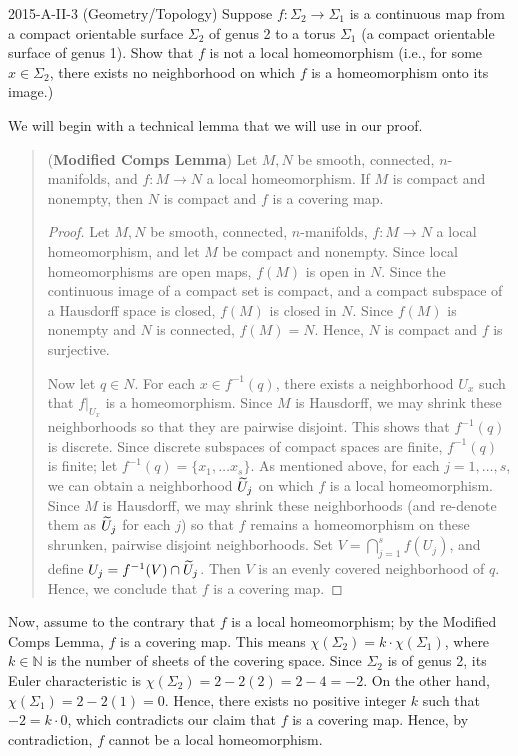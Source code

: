 \documentclass{article}
\begin{document}
\begin{prb}{2015-A-II-3 (Geometry/Topology)}
	Suppose $f: \Sigma_{2} \to \Sigma_{1}$ is a continuous map from a compact orientable surface $\Sigma_{2}$ of genus 2 to a torus $\Sigma_{1}$ (a compact orientable surface of genus 1). Show that $f$ is not a local homeomorphism (i.e., for some $x \in \Sigma_{2}$, there exists no neighborhood on which $f$ is a homeomorphism onto its image.)
\end{prb}
\begin{solutions}
	We will begin with a technical lemma that we will use in our proof. 
		\begin{quote}
			(\textbf{Modified Comps Lemma}) Let $M, N$ be smooth, connected, $n$-manifolds, and $f: M\to N$ a local homeomorphism. If $M$ is compact and nonempty, then $N$ is compact and $f$ is a covering map. 
			
			\begin{proof}
				Let $M, N$ be smooth, connected, $n$-manifolds, $f: M \to N$ a local homeomorphism, and let $M$ be compact and nonempty. Since local homeomorphisms are open maps, $f(M)$ is open in $N$. Since the continuous image of a compact set is compact, and a compact subspace of a Hausdorff space is closed, $f(M)$ is closed in $N$. Since $f(M)$ is nonempty and $N$ is connected, $f(M) = N$. Hence, $N$ is compact and $f$ is surjective. 
				
				Now let $q \in N$. For each $x \in f^{-1}(q)$, there exists a neighborhood $U_{x}$ such that $f|_{U_{x}}$ is a homeomorphism. Since $M$ is Hausdorff, we may shrink these neighborhoods so that they are pairwise disjoint. This shows that $f^{-1}(q)$ is discrete. Since discrete subspaces of compact spaces are finite, $f^{-1}(q)$ is finite; let $f^{-1}(q) = \{x_{1}, \ldots x_{s}\}$. As mentioned above, for each $j = 1, \ldots, s$, we can obtain a neighborhood $\widetilde{U}_{j}$ on which $f$ is a local homeomorphism. Since $M$ is Hausdorff, we may shrink these neighborhoods (and re-denote them as $\widetilde{U}_{j}$ for each $j$) so that $f$ remains a homeomorphism on these shrunken, pairwise disjoint neighborhoods. Set $V = \bigcap_{j = 1}^{s}f(U_{j})$, and define $U_{j} = f^{-1}(V) \cap \widetilde{U}_{j}$. Then $V$ is an evenly covered neighborhood of $q$. Hence, we conclude that $f$ is a covering map. 
			\end{proof}
		\end{quote}
	Now, assume to the contrary that $f$ is a local homeomorphism; by the Modified Comps Lemma, $f$ is a covering map. This means $\chi(\Sigma_{2}) = k \cdot \chi(\Sigma_{1})$, where $k \in \mathbb{N}$ is the number of sheets of the covering space. Since $\Sigma_{2}$ is of genus 2, its Euler characteristic is $\chi(\Sigma_{2}) = 2 - 2(2) = 2- 4 = -2$. On the other hand, $\chi(\Sigma_{1}) = 2 - 2(1) = 0$. Hence, there exists no positive integer $k$ such that $-2 = k \cdot 0$, which contradicts our claim that $f$ is a covering map. Hence, by contradiction, $f$ cannot be a local homeomorphism. 
\end{solutions}
\end{document}
